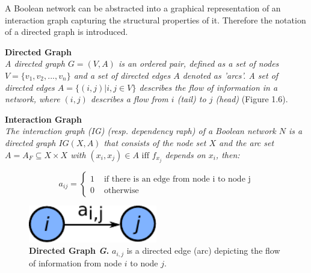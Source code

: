 A Boolean network can be abstracted into a graphical representation of an interaction graph capturing the structural properties of it. Therefore the notation of a directed graph is introduced.

\newpage
\begin{defn}
\textbf{Directed Graph}\\
\textit{A directed graph $G=(V,A)$ is an ordered pair, defined as a set of nodes $V=\{v_{1},v_{2},...,v_{n}\}$ and a set of directed edges $A$ denoted as 'arcs'. A set of directed edges $A=\{ (i,j)|i,j\in V\} $ describes the flow of information in a network, where $(i,j)$ describes a flow from $i$ (tail) to $j$ (head)} (Figure 1.6).\\
\end{defn} 
\citep{Pavlopoulos.2011}

\begin{defn}\textbf{Interaction Graph}\\
\textit{The interaction graph (\gls{IG}) (resp. dependency raph) of a Boolean network $N$ is a directed graph $IG(X,A)$ that consists of the node set $X$ and the arc set $A = A _{F} \subseteq X \times X$ with $(x_{i},x_{j})\in A \text{ iff }f_{x_{j}}$ depends on $x_{i}$, then:}
\end{defn} 
\begin{equation}
a_{ij}=\begin{cases}
1 & \text{ if there is an edge from node i to node j}\\
0 & \text{ otherwise}
\end{cases}
\end{equation}
\citep{HannesKlarner.November2014T}

\begin{figure}
	\begin{minipage}{0.4\linewidth}
	\hspace{30px}
	\includegraphics[width=0.5\textwidth]{./Bilder/DirectedGraph.pdf}
	\end{minipage}
	\caption[Directed Graph \textit{G}]{\textbf{Directed Graph \textit{G}. }$a_{i,j}$ is a directed edge (arc) depicting the flow of information from node $i$ to node $j$.}
	\label{fig:7}
\end{figure}

